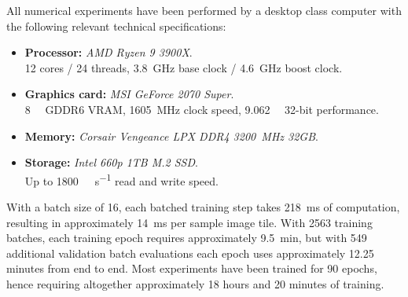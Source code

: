
All numerical experiments have been performed by a desktop class computer with the following relevant technical specifications:

\begin{itemize}[nosep]
  \item \textbf{Processor:} \textit{AMD Ryzen 9 3900X}. \\
    12 cores / 24 threads, \SI{3.8}{\giga\hertz} base clock / \SI{4.6}{\giga\hertz} boost clock.
  \item \textbf{Graphics card:} \textit{MSI GeForce 2070 Super}. \\
    \SI{8}{\giga\byte} GDDR6 VRAM, \SI{1605}{\mega\hertz} clock speed, \SI{9.062}{\tera\flops} 32-bit performance.
  \item \textbf{Memory:} \textit{Corsair Vengeance LPX DDR4 \SI{3200}{\mega\hertz} 32GB}.
  \item \textbf{Storage:} \textit{Intel 660p 1TB M.2 SSD}. \\
    Up to \SI{1800}{\mega\byte\per\second} read and write speed.
\end{itemize}

With a batch size of 16, each batched training step takes \SI{218}{\milli\second} of computation, resulting in approximately \SI{14}{\milli\second} per sample image tile.
With \num{2563} training batches, each training epoch requires approximately \SI{9.5}{\minute}, but with \num{549} additional validation batch evaluations each epoch uses approximately \num{12.25} minutes from end to end.
Most experiments have been trained for 90 epochs, hence requiring altogether approximately 18 hours and 20 minutes of training.
